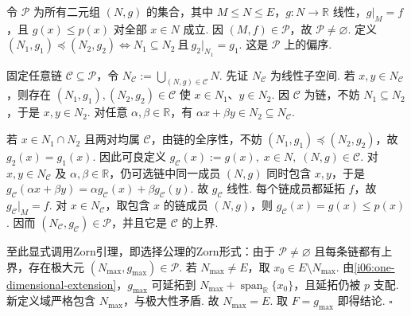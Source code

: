 \begin{FAProof}
令 \(\displaystyle \mathcal P\) 为所有二元组 \(\displaystyle (N,g)\) 的集合，其中 \(\displaystyle M\leqslant N\leqslant E\)，\(\displaystyle g:N\to\mathbb R\) 线性，\(\displaystyle g|_M=f\)，且 \(\displaystyle g(x)\leqslant p(x)\) 对全部 \(\displaystyle x\in N\) 成立. 因 \(\displaystyle (M,f)\in\mathcal P\)，故 \(\displaystyle \mathcal P\neq\varnothing\). 定义 \(\displaystyle (N_1,g_1)\preccurlyeq(N_2,g_2) \iff N_1\subseteq N_2\ \text{且}\ g_2|_{N_1}=g_1\).
这是 \(\displaystyle \mathcal P\) 上的偏序.

固定任意链 \(\displaystyle \mathcal C\subseteq\mathcal P\)，令 \(\displaystyle N_{\mathcal C} :=\bigcup_{(N,g)\in\mathcal C}N\).
先证 \(\displaystyle N_{\mathcal C}\) 为线性子空间. 若 \(\displaystyle x,y\in N_{\mathcal C}\)，则存在 \(\displaystyle (N_1,g_1),(N_2,g_2)\in\mathcal C\) 使 \(\displaystyle x\in N_1\)、\(\displaystyle y\in N_2\). 因 \(\displaystyle \mathcal C\) 为链，不妨 \(\displaystyle N_1\subseteq N_2\)，于是 \(\displaystyle x,y\in N_2\). 对任意 \(\displaystyle \alpha,\beta\in\mathbb R\)，有 \(\displaystyle \alpha x+\beta y\in N_2\subseteq N_{\mathcal C}\).

若 \(\displaystyle x\in N_1\cap N_2\) 且两对均属 \(\displaystyle \mathcal C\)，由链的全序性，不妨 \(\displaystyle (N_1,g_1)\preccurlyeq(N_2,g_2)\)，故 \(\displaystyle g_2(x)=g_1(x)\). 因此可良定义 \(\displaystyle g_{\mathcal C}(x):=g(x), \; x\in N, \; (N,g)\in\mathcal C\).
对 \(\displaystyle x,y\in N_{\mathcal C}\) 及 \(\displaystyle \alpha,\beta\in\mathbb R\)，仍可选链中同一成员 \(\displaystyle (N,g)\) 同时包含 \(\displaystyle x,y\)，于是 \(\displaystyle g_{\mathcal C}(\alpha x+\beta y) =\alpha g_{\mathcal C}(x)+\beta g_{\mathcal C}(y)\).
故 \(\displaystyle g_{\mathcal C}\) 线性. 每个链成员都延拓 \(\displaystyle f\)，故 \(\displaystyle g_{\mathcal C}|_M=f\). 对 \(\displaystyle x\in N_{\mathcal C}\)，取包含 \(\displaystyle x\) 的链成员 \(\displaystyle (N,g)\)，则 \(\displaystyle g_{\mathcal C}(x)=g(x)\leqslant p(x)\). 因而 \(\displaystyle (N_{\mathcal C},g_{\mathcal C})\in\mathcal P\)，并且它是 \(\displaystyle \mathcal C\) 的上界.

至此显式调用Zorn引理，即选择公理的Zorn形式：由于 \(\displaystyle \mathcal P\neq\varnothing\) 且每条链都有上界，存在极大元 \(\displaystyle (N_{\max},g_{\max})\in\mathcal P\). 若 \(\displaystyle N_{\max}\neq E\)，取 \(\displaystyle x_0\in E\setminus N_{\max}\). 由\autoref{i06:one-dimensional-extension}，\(\displaystyle g_{\max}\) 可延拓到 \(\displaystyle N_{\max}+\operatorname{span}_{\mathbb R}\{x_0\}\)，且延拓仍被 \(\displaystyle p\) 支配. 新定义域严格包含 \(\displaystyle N_{\max}\)，与极大性矛盾. 故 \(\displaystyle N_{\max}=E\). 取 \(\displaystyle F=g_{\max}\) 即得结论.
\hfill\(\square\)
\end{FAProof}

